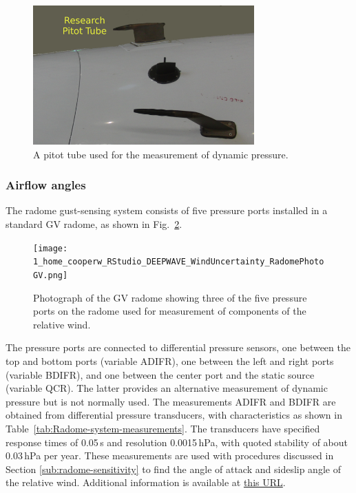 \documentclass[12pt,twoside,english]{article}\usepackage[]{graphicx}\usepackage[]{color}
\let\OrgIndex\index
\renewcommand*{\index}[1]{\OrgIndex{#1}}
\begin{document}
\begin{figure}
\noindent \begin{centering}
\includegraphics[width=8.5cm]{PitotTube-r.png}  
\par\end{centering}

\protect\caption{A pitot tube used for the measurement of dynamic pressure.\label{fig:pitot-tube-photo}}
\end{figure}



\subsubsection{Airflow angles\label{sub:Airflow-angles}}

The radome gust-sensing system consists of five pressure ports installed in a standard GV radome, as shown in Fig.~\ref{fig:radome-photo}. 
\begin{figure}
\noindent \begin{centering}
\texttt{[image: 1\_home\_cooperw\_RStudio\_DEEPWAVE\_WindUncertainty\_RadomePhotoGV.png]}  
\par\end{centering}

\protect\caption{Photograph of the GV radome showing three of the five pressure ports on the radome used for measurement of components of the relative wind.\label{fig:radome-photo}} 
\end{figure}

The pressure ports are connected to differential pressure sensors, one between the top and bottom ports (variable ADIFR),\sindex[var]{ADIFR=pressure difference, bottom minus top source on radome {[}hPa} one between the left and right ports (variable BDIFR), and one between the center port and the static source (variable QCR). The latter provides an alternative measurement of dynamic pressure but is not normally used. The measurements ADIFR and BDIFR are obtained from differential pressure transducers, with characteristics as shown in Table~\ref{tab:Radome-system-measurements}. The transducers have specified response times of 0.05\,s and resolution 0.0015\,hPa, with quoted stability of about 0.03\,hPa per year. These measurements are used with procedures discussed in Section \ref{sub:radome-sensitivity} to find the angle of attack and sideslip angle of the relative wind. Additional information is available at \href{https://www.eol.ucar.edu/instruments/radome-gust-probe-3-d-wind-measurements}{this URL}. 
\end{document}
